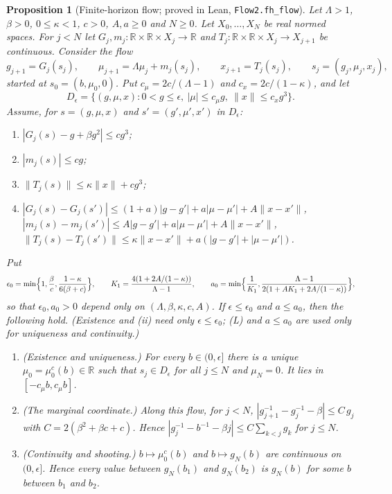 \documentclass[11pt]{amsart}
\newtheorem{proposition}[theorem]{Proposition}
\theoremstyle{definition}
\theoremstyle{remark}
\numberwithin{equation}{section}
\newcommand{\R}{\mathbb{R}}
\begin{document}
\begin{proposition}[Finite-horizon flow; proved in Lean, \texttt{Flow2.fh\_flow}]\label{prop:fh-flow}
Let $\Lambda>1$, $\beta>0$, $0\le\kappa<1$, $c>0$, $A,a\ge0$ and $N\ge0$. Let $X_0,\dots,X_N$ be real
normed spaces. For $j<N$ let $G_j,m_j:\R\times\R\times X_j\to\R$ and
$T_j:\R\times\R\times X_j\to X_{j+1}$ be continuous. Consider the flow
\[
  g_{j+1}=G_j(s_j),\qquad\mu_{j+1}=\Lambda\mu_j+m_j(s_j),\qquad x_{j+1}=T_j(s_j),\qquad
  s_j=(g_j,\mu_j,x_j),
\]
started at $s_0=(b,\mu_0,0)$. Put $c_\mu=2c/(\Lambda-1)$ and $c_x=2c/(1-\kappa)$, and let
\[
  D_\epsilon=\{(g,\mu,x):0<g\le\epsilon,\ |\mu|\le c_\mu g,\ \|x\|\le c_xg^3\}.
\]
Assume, for $s=(g,\mu,x)$ and $s'=(g',\mu',x')$ in $D_\epsilon$:
\begin{enumerate}
\item[(F1)] $|G_j(s)-g+\beta g^2|\le cg^3$;
\item[(F2)] $|m_j(s)|\le cg$;
\item[(F3)] $\|T_j(s)\|\le\kappa\|x\|+cg^3$;
\item[(L)] $|G_j(s)-G_j(s')|\le(1+a)|g-g'|+a|\mu-\mu'|+A\|x-x'\|$,\\
  $|m_j(s)-m_j(s')|\le A|g-g'|+a|\mu-\mu'|+A\|x-x'\|$,\\
  $\|T_j(s)-T_j(s')\|\le\kappa\|x-x'\|+a(|g-g'|+|\mu-\mu'|)$.
\end{enumerate}
Put
\[
  \epsilon_0=\min\Bigl\{1,\frac\beta c,\frac{1-\kappa}{6(\beta+c)}\Bigr\},\qquad
  K_1=\frac{4(1+2A/(1-\kappa))}{\Lambda-1},\qquad
  a_0=\min\Bigl\{\frac1{K_1},\frac{\Lambda-1}{2(1+AK_1+2A/(1-\kappa))}\Bigr\},
\]
so that $\epsilon_0,a_0>0$ depend only on $(\Lambda,\beta,\kappa,c,A)$. If $\epsilon\le\epsilon_0$
and $a\le a_0$, then the following hold.
(Existence and (ii) need only $\epsilon\le\epsilon_0$; (L) and $a\le a_0$ are used only for
uniqueness and continuity.)
\begin{enumerate}
\item[(i)] (Existence and uniqueness.) For every $b\in(0,\epsilon]$ there is a unique
  $\mu_0=\mu_0^c(b)\in\R$ such that $s_j\in D_\epsilon$ for all $j\le N$ and $\mu_N=0$. It lies in
  $[-c_\mu b,c_\mu b]$.
\item[(ii)] (The marginal coordinate.) Along this flow, for $j<N$,
  $|g_{j+1}^{-1}-g_j^{-1}-\beta|\le C\,g_j$ with $C=2(\beta^2+\beta c+c)$. Hence
  $|g_j^{-1}-b^{-1}-\beta j|\le C\sum_{k<j}g_k$ for $j\le N$.
\item[(iii)] (Continuity and shooting.) $b\mapsto\mu_0^c(b)$ and $b\mapsto g_N(b)$ are continuous
  on $(0,\epsilon]$. Hence every value between $g_N(b_1)$ and $g_N(b_2)$ is $g_N(b)$ for some $b$
  between $b_1$ and $b_2$.
\end{enumerate}
\end{proposition}
\end{document}

